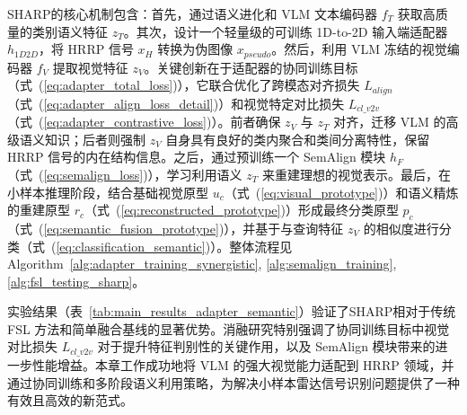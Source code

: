 SHARP的核心机制包含：首先，通过语义进化和 VLM 文本编码器 $f_T$ 获取高质量的类别语义特征 $z_T$。其次，设计一个轻量级的可训练 1D-to-2D 输入端适配器 $h_{1D2D}$，将 HRRP 信号 $x_H$ 转换为伪图像 $x_{pseudo}$。然后，利用 VLM 冻结的视觉编码器 $f_V$ 提取视觉特征 $z_V$。关键创新在于适配器的协同训练目标（式~(\ref{eq:adapter_total_loss})），它联合优化了跨模态对齐损失 $L_{align}$（式~(\ref{eq:adapter_align_loss_detail})）和视觉特定对比损失 $L_{cl\_v2v}$（式~(\ref{eq:adapter_contrastive_loss})）。前者确保 $z_V$ 与 $z_T$ 对齐，迁移 VLM 的高级语义知识；后者则强制 $z_V$ 自身具有良好的类内聚合和类间分离特性，保留 HRRP 信号的内在结构信息。之后，通过预训练一个 SemAlign 模块 $h_F$（式~(\ref{eq:semalign_loss})），学习利用语义 $z_T$ 来重建理想的视觉表示。最后，在小样本推理阶段，结合基础视觉原型 $u_c$（式~(\ref{eq:visual_prototype})）和语义精炼的重建原型 $r_c$（式~(\ref{eq:reconstructed_prototype})）形成最终分类原型 $p_c$（式~(\ref{eq:semantic_fusion_prototype})），并基于与查询特征 $z_V$ 的相似度进行分类（式~(\ref{eq:classification_semantic})）。整体流程见 Algorithm~\ref{alg:adapter_training_synergistic}, \ref{alg:semalign_training}, \ref{alg:fsl_testing_sharp}。

实验结果（表~\ref{tab:main_results_adapter_semantic}）验证了SHARP相对于传统 FSL 方法和简单融合基线的显著优势。消融研究特别强调了协同训练目标中视觉对比损失 $L_{cl\_v2v}$ 对于提升特征判别性的关键作用，以及 SemAlign 模块带来的进一步性能增益。本章工作成功地将 VLM 的强大视觉能力适配到 HRRP 领域，并通过协同训练和多阶段语义利用策略，为解决小样本雷达信号识别问题提供了一种有效且高效的新范式。